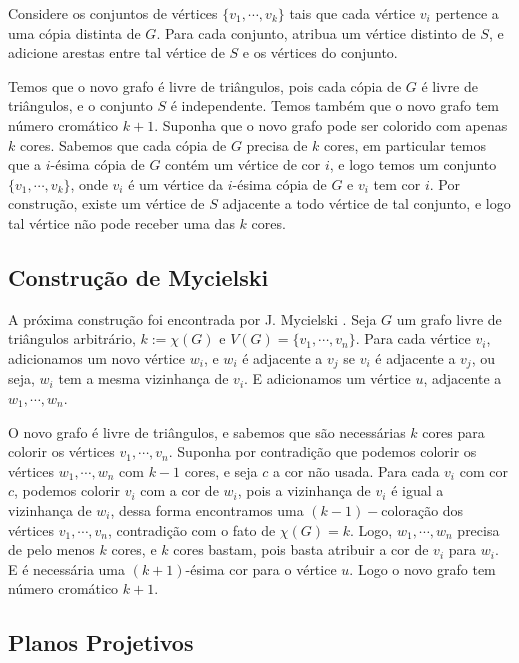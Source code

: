 Considere os conjuntos de vértices $\{v_1,\cdots,v_k\}$ tais que cada vértice $v_i$ pertence a uma cópia distinta de $G$. Para cada conjunto, atribua um vértice distinto de $S$, e adicione arestas entre tal vértice de $S$ e os vértices do conjunto.

Temos que o novo grafo é livre de triângulos, pois cada cópia de $G$ é livre de triângulos, e o conjunto $S$ é independente. Temos também que o novo grafo tem número cromático $k+1$. Suponha que o novo grafo pode ser colorido com apenas $k$ cores. Sabemos que cada cópia de $G$ precisa de $k$ cores, em particular temos que a $i$-ésima cópia de $G$ contém um vértice de cor $i$, e logo temos um conjunto $\{v_1,\cdots,v_k\}$, onde $v_i$ é um vértice da $i$-ésima cópia de $G$ e $v_i$ tem cor $i$. Por construção, existe um vértice de $S$ adjacente a todo vértice de tal conjunto, e logo tal vértice não pode receber uma das $k$ cores.

\subsection{Construção de Mycielski}

A próxima construção foi encontrada por J. Mycielski \cite{mycielski1955coloriage}. Seja $G$ um grafo livre de triângulos arbitrário, $k := \chi(G)$ e $V(G) = \{v_1, \cdots, v_n\}$. Para cada vértice $v_i$, adicionamos um novo vértice $w_i$, e $w_i$ é adjacente a $v_j$ se $v_i$ é adjacente a $v_j$, ou seja, $w_i$ tem a mesma vizinhança de $v_i$. E adicionamos um vértice $u$, adjacente a $w_1, \cdots, w_n$.

O novo grafo é livre de triângulos, e sabemos que são necessárias $k$ cores para colorir os vértices $v_1, \cdots, v_n$. Suponha por contradição que podemos colorir os vértices $w_1,\cdots, w_n$ com $k-1$ cores, e seja $c$ a cor não usada. Para cada $v_i$ com cor $c$, podemos colorir $v_i$ com a cor de $w_i$, pois a vizinhança de $v_i$ é igual a vizinhança de $w_i$, dessa forma encontramos uma $(k-1)-$coloração dos vértices $v_1,\cdots,v_n$, contradição com o fato de $\chi(G) = k$. Logo, $w_1,\cdots,w_n$ precisa de pelo menos $k$ cores, e $k$ cores bastam, pois basta atribuir a cor de $v_i$ para $w_i$. E é necessária uma $(k+1)$-ésima cor para o vértice $u$. Logo o novo grafo tem número cromático $k+1$.

\subsection{Planos Projetivos}

